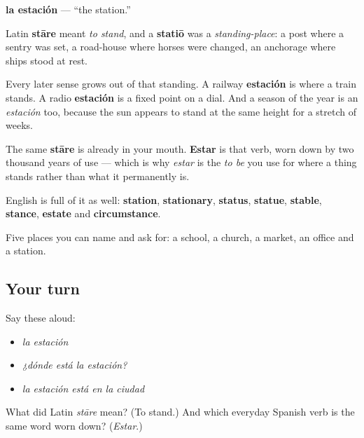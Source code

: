 \begin{cousinweb}
\textbf{la estación} — \textquotedblleft{}the station.\textquotedblright{}

Latin \textbf{stāre} meant \emph{to stand}, and a \textbf{statiō} was a \emph{standing-place}: a post where a sentry was set, a road-house where horses were changed, an anchorage where ships stood at rest.

Every later sense grows out of that standing. A railway \textbf{estación} is where a train stands. A radio \textbf{estación} is a fixed point on a dial. And a season of the year is an \emph{estación} too, because the sun appears to stand at the same height for a stretch of weeks.

The same \textbf{stāre} is already in your mouth. \textbf{Estar} is that verb, worn down by two thousand years of use — which is why \emph{estar} is the \emph{to be} you use for where a thing stands rather than what it permanently is.

English is full of it as well: \textbf{station}, \textbf{stationary}, \textbf{status}, \textbf{statue}, \textbf{stable}, \textbf{stance}, \textbf{estate} and \textbf{circumstance}.
\end{cousinweb}

\begin{grammarlens}[title={What you've built}]
Five places you can name and ask for: a school, a church, a market, an office and a station.
\end{grammarlens}

\subsection*{Your turn}
Say these aloud:

\begin{itemize}
\raggedright
  \item \emph{la estación}
  \item \emph{¿dónde está la estación?}
  \item \emph{la estación está en la ciudad}
\end{itemize}

\begin{tcolorbox}[breakable,colback=teal!4,colframe=teal!35!black,title={Before you move on}]
What did Latin \emph{stāre} mean? (To stand.) And which everyday Spanish verb is the same word worn down? (\emph{Estar}.)
\end{tcolorbox}
